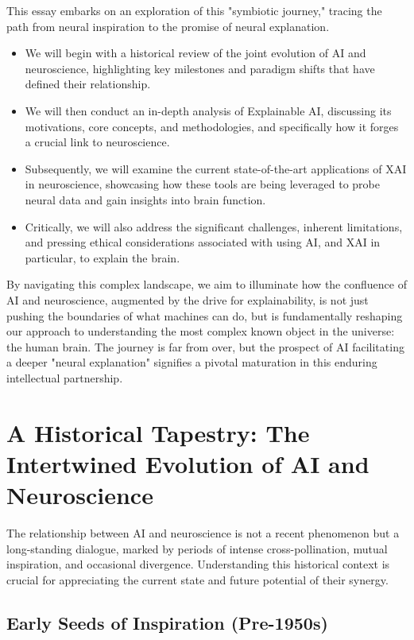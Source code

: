 \documentclass[11pt,a4paper]{article}
\begin{document}
This essay embarks on an exploration of this "symbiotic journey," tracing the path from neural inspiration to the promise of neural explanation. 
\begin{itemize}
    \item We will begin with a historical review of the joint evolution of AI and neuroscience, highlighting key milestones and paradigm shifts that have defined their relationship. 
    \item We will then conduct an in-depth analysis of Explainable AI, discussing its motivations, core concepts, and methodologies, and specifically how it forges a crucial link to neuroscience.
    \item Subsequently, we will examine the current state-of-the-art applications of XAI in neuroscience, showcasing how these tools are being leveraged to probe neural data and gain insights into brain function. 
    \item Critically, we will also address the significant challenges, inherent limitations, and pressing ethical considerations associated with using AI, and XAI in particular, to explain the brain.
\end{itemize}
By navigating this complex landscape, we aim to illuminate how the confluence of AI and neuroscience, augmented by the drive for explainability, is not just pushing the boundaries of what machines can do, but is fundamentally reshaping our approach to understanding the most complex known object in the universe: the human brain. The journey is far from over, but the prospect of AI facilitating a deeper "neural explanation" signifies a pivotal maturation in this enduring intellectual partnership.

\section{A Historical Tapestry: The Intertwined Evolution of AI and Neuroscience}

The relationship between AI and neuroscience is not a recent phenomenon but a long-standing dialogue, marked by periods of intense cross-pollination, mutual inspiration, and occasional divergence. Understanding this historical context is crucial for appreciating the current state and future potential of their synergy.

\subsection{Early Seeds of Inspiration (Pre-1950s)}
\end{document}
